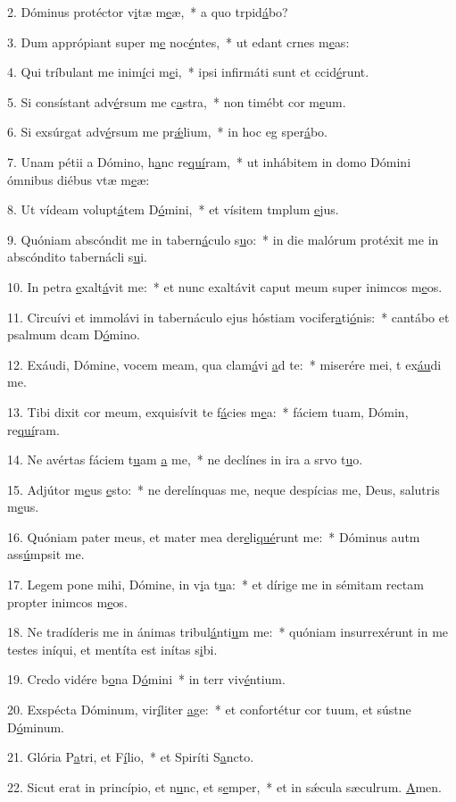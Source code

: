 2. Dóminus protéctor v\uline{i}tæ m\uline{e}æ,~* a quo trpid\uline{á}bo?\par 
3. Dum apprópiant super m\uline{e} noc\uline{é}ntes,~* ut edant crnes m\uline{e}as:\par 
4. Qui tríbulant me inim\uline{í}ci m\uline{e}i,~* ipsi infirmáti sunt et ccid\uline{é}runt.\par 
5. Si consístant adv\uline{é}rsum me c\uline{a}stra,~* non timébt cor m\uline{e}um.\par 
6. Si exsúrgat adv\uline{é}rsum me pr\uline{ǽ}lium,~* in hoc eg sper\uline{á}bo.\par 
7. Unam pétii a Dómino, h\uline{a}nc re\uline{quí}ram,~* ut inhábitem in domo Dómini ómnibus diébus vtæ m\uline{e}æ:\par 
8. Ut vídeam volupt\uline{á}tem D\uline{ó}mini,~* et vísitem tmplum \uline{e}jus.\par 
9. Quóniam abscóndit me in tabern\uline{á}culo s\uline{u}o:~* in die malórum protéxit me in abscóndito tabernácli s\uline{u}i.\par 
10. In petra \uline{e}xalt\uline{á}vit me:~* et nunc exaltávit caput meum super inimcos m\uline{e}os.\par 
11. Circuívi et immolávi in tabernáculo ejus hóstiam vocifer\uline{a}ti\uline{ó}nis:~* cantábo et psalmum dcam D\uline{ó}mino.\par 
12. Exáudi, Dómine, vocem meam, qua clam\uline{á}vi \uline{a}d te:~* miserére mei, t ex\uline{áu}di me.\par 
13. Tibi dixit cor meum, exquisívit te f\uline{á}cies m\uline{e}a:~* fáciem tuam, Dómin, re\uline{quí}ram.\par 
14. Ne avértas fáciem t\uline{u}am \uline{a} me,~* ne declínes in ira a srvo t\uline{u}o.\par 
15. Adjútor m\uline{e}us \uline{e}sto:~* ne derelínquas me, neque despícias me, Deus, salutris m\uline{e}us.\par 
16. Quóniam pater meus, et mater mea der\uline{e}li\uline{qué}runt me:~* Dóminus autm ass\uline{ú}mpsit me.\par 
17. Legem pone mihi, Dómine, in v\uline{i}a t\uline{u}a:~* et dírige me in sémitam rectam propter inimcos m\uline{e}os.\par 
18. Ne tradíderis me in ánimas tribul\uline{á}nti\uline{u}m me:~* quóniam insurrexérunt in me testes iníqui, et mentíta est inítas s\uline{i}bi.\par 
19. Credo vidére b\uline{o}na D\uline{ó}mini~* in terr viv\uline{é}ntium.\par 
20. Exspécta Dóminum, vir\uline{í}liter \uline{a}ge:~* et confortétur cor tuum, et sústne D\uline{ó}minum.\par 
21. Glória P\uline{a}tri, et F\uline{í}lio,~* et Spiríti S\uline{a}ncto.\par 
22. Sicut erat in princípio, et n\uline{u}nc, et s\uline{e}mper,~* et in sǽcula sæculrum. \uline{A}men.\par 
